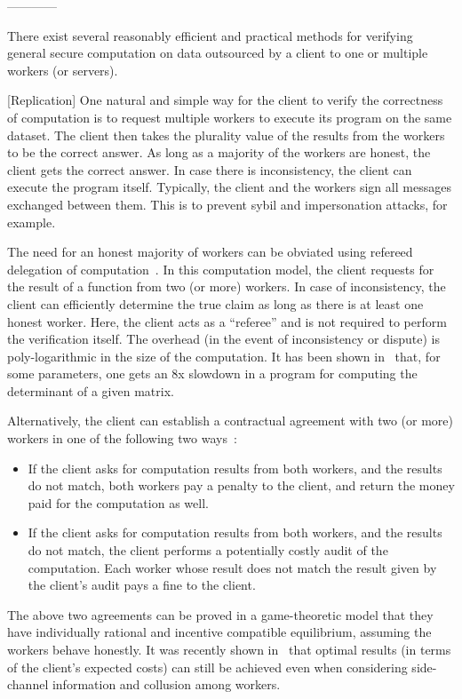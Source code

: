 ------------

There exist several reasonably efficient and practical methods for verifying general secure computation on data outsourced by a client to one or multiple workers (or servers).

[Replication]
One natural and simple way for the client to verify the correctness of computation is to request multiple workers to execute its program on the same dataset. The client then takes the plurality value of the results from the workers to be the correct answer. As long as a majority of the workers are honest, the client gets the correct answer. In case there is inconsistency, the client can execute the program itself. Typically, the client and the workers sign all messages exchanged between them. This is to prevent sybil and impersonation attacks, for example.

The need for an honest majority of workers can be obviated using refereed delegation of computation~\cite{CRR11}. In this computation model, the client requests for the result of a function from two (or more) workers. In case of inconsistency, the client can efficiently determine the true claim as long as there is at least one honest worker. Here, the client acts as a ``referee'' and is not required to perform the verification itself. The overhead (in the event of inconsistency or dispute) is poly-logarithmic in the size of the computation. It has been shown in~\cite{CRR11} that, for some parameters, one gets an 8x slowdown in a program for computing the determinant of a given matrix.

Alternatively, the client can establish a contractual agreement with two (or more) workers in one of the following two ways~\cite{NK12}:
\begin{itemize}
 \item If the client asks for computation results from both workers, and the results do not match, both workers pay a penalty to the client, and return the money paid for the computation as well.
 \item If the client asks for computation results from both workers, and the results do not match, the client performs a potentially costly audit of the computation. Each worker whose result does not match the result given by the client's audit pays a fine to the client.
\end{itemize}
The above two agreements can be proved in a game-theoretic model that they have individually rational and incentive compatible equilibrium, assuming the workers behave honestly. 
It was recently shown in~\cite{CKP14} that optimal results (in terms of the client's expected costs) can still be achieved even when considering side-channel information and collusion among workers.

